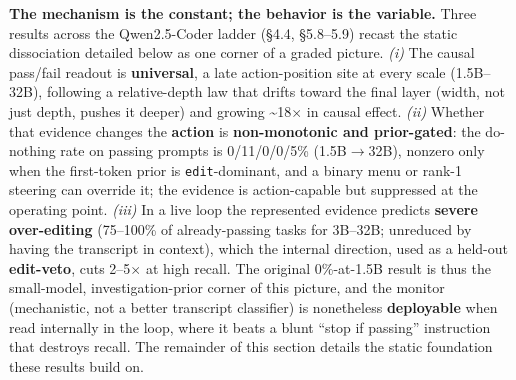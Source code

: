 \documentclass[
  11pt,
  a4paper]{article}
\newcounter{none} %
\begin{document}
\textbf{The mechanism is the constant; the behavior is the variable.}
Three results across the Qwen2.5-Coder ladder (\S{}4.4, \S{}5.8--5.9) recast
the static dissociation detailed below as one corner of a graded
picture. \emph{(i)} The causal pass/fail readout is \textbf{universal},
a late action-position site at every scale (1.5B--32B), following a
relative-depth law that drifts toward the final layer (width, not just
depth, pushes it deeper) and growing \textasciitilde18\ensuremath{\times} in causal
effect. \emph{(ii)} Whether that evidence changes the \textbf{action} is
\textbf{non-monotonic and prior-gated}: the do-nothing rate on passing
prompts is 0/11/0/0/5\% (1.5B\ensuremath{\rightarrow}32B), nonzero only when the first-token
prior is \texttt{edit}-dominant, and a binary menu or rank-1 steering
can override it; the evidence is action-capable but suppressed at the
operating point. \emph{(iii)} In a live loop the represented evidence
predicts \textbf{severe over-editing} (75--100\% of already-passing
tasks for 3B--32B; unreduced by having the transcript in context), which
the internal direction, used as a held-out \textbf{edit-veto}, cuts
2--5\ensuremath{\times} at high recall. The original 0\%-at-1.5B result is thus the
small-model, investigation-prior corner of this picture, and the monitor
(mechanistic, not a better transcript classifier) is nonetheless
\textbf{deployable} when read internally in the loop, where it beats a
blunt ``stop if passing'' instruction that destroys recall. The
remainder of this section details the static foundation these results
build on.
\end{document}
